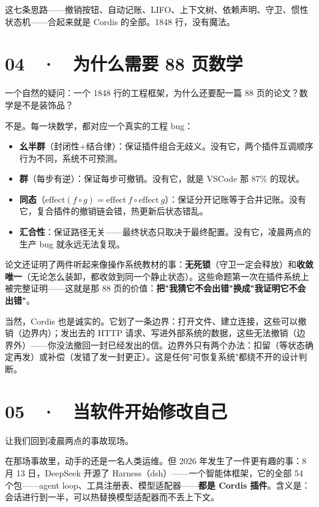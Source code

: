 \documentclass[11pt,a4paper]{article}
\begin{document}
\begin{center}

\end{center}

这七条思路——撤销按钮、自动记账、LIFO、上下文树、依赖声明、守卫、惯性状态机——合起来就是 Cordis 的全部。1848 行，没有魔法。

\section*{04 \ · \ 为什么需要 88 页数学}

一个自然的疑问：一个 1848 行的工程框架，为什么还要配一篇 88 页的论文？数学是不是装饰品？

不是。每一块数学，都对应一个真实的工程 bug：

\begin{itemize}
\item \textbf{幺半群}（封闭性+结合律）：保证插件组合无歧义。没有它，两个插件互调顺序行为不同，系统不可预测。
\item \textbf{群}（每步有逆）：保证每步可撤销。没有它，就是 VSCode 那 87\% 的现状。
\item \textbf{同态}（$\text{effect}(f \circ g) = \text{effect}\ f \circ \text{effect}\ g$）：保证分开记账等于合并记账。没有它，复合插件的撤销链会错，热更新后状态错乱。
\item \textbf{汇合性}：保证路径无关——最终状态只取决于最终配置。没有它，凌晨两点的生产 bug 就永远无法复现。
\end{itemize}

论文还证明了两件听起来像操作系统教材的事：\textbf{无死锁}（守卫一定会释放）和\textbf{收敛唯一}（无论怎么装卸，都收敛到同一个静止状态）。这些命题第一次在插件系统上被完整证明——这就是那 88 页的价值：\textbf{把"我猜它不会出错"换成"我证明它不会出错"}。

当然，Cordis 也是诚实的。它划了一条边界：打开文件、建立连接，这些可以撤销（边界内）；发出去的 HTTP 请求、写进外部系统的数据，这些无法撤销（边界外）——你没法撤回一封已经发出的信。边界外只有两个办法：扣留（等状态确定再发）或补偿（发错了发一封更正）。这是任何"可恢复系统"都绕不开的设计判断。

\section*{05 \ · \ 当软件开始修改自己}

让我们回到凌晨两点的事故现场。

在那场事故里，动手的还是一名人类运维。但 2026 年发生了一件更有趣的事：8 月 13 日，DeepSeek 开源了 Harness（dsh）——一个智能体框架，它的全部 54 个包——agent loop、工具注册表、模型适配器——\textbf{都是 Cordis 插件}。含义是：会话进行到一半，可以热替换模型适配器而不丢上下文。
\end{document}
